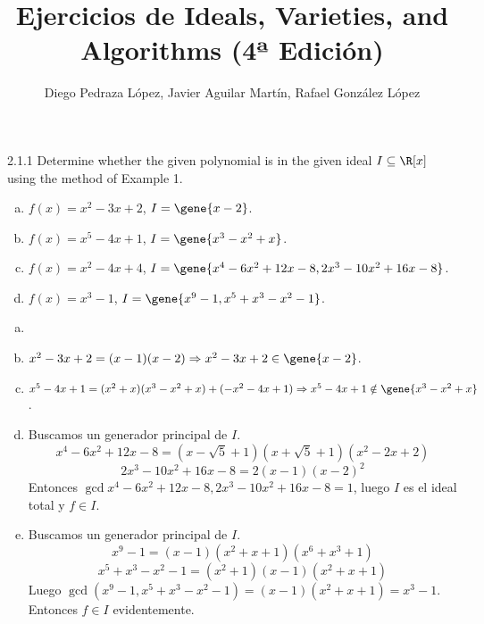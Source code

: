 \documentclass[twoside]{article}
\begin{document}
\title{Ejercicios de Ideals, Varieties, and Algorithms (4ª Edición)}
\author{Diego Pedraza López, Javier Aguilar Martín, Rafael González López}
\maketitle

\begin{ejercicio}{2.1.1}
Determine whether the given polynomial is in the given ideal $I \subseteq \R[x]$ using the method of Example 1.
\begin{enumerate}[a.]
\item $f(x) = x^2-3x+2$, $I = \gene{x-2}$.
\item $f(x) = x^5-4x+1$, $I = \gene{x^3-x^2+x}$.
\item $f(x) = x^2-4x+4$, $I = \gene{x^4-6x^2+12x-8,2x^3-10x^2+16x-8}$.
\item $f(x) = x^3-1$, $I = \gene{x^9-1,x^5+x^3-x^2-1}$.
\end{enumerate}
\end{ejercicio}
\begin{solucion}
\begin{enumerate}[a.]
\item[]
\item $x^2-3x+2 = (x-1)(x-2) \Rightarrow x^2-3x+2 \in \gene{x-2}$.
\item $x^5-4x+1 = (x^2+x)(x^3-x^2+x)+(-x^2-4x+1) \Rightarrow x^5-4x+1 \notin \gene{x^3-x^2+x}$.
\item Buscamos un generador principal de $I$.
\[ x^4-6x^2+12x-8 = (x-\sqrt{5}+1)(x+\sqrt{5}+1)(x^2-2x+2) \]
\[ 2x^3-10x^2+16x-8 = 2(x-1)(x-2)^2 \]
Entonces $\gcd{x^4-6x^2+12x-8,2x^3-10x^2+16x-8}=1$, luego $I$ es el ideal total y $f \in I$.
\item Buscamos un generador principal de $I$.
\[ x^9-1 = (x-1)(x^2+x+1)(x^6+x^3+1) \]
\[ x^5+x^3-x^2-1 = (x^2+1)(x-1)(x^2+x+1) \]
Luego $\gcd(x^9-1,x^5+x^3-x^2-1) = (x-1)(x^2+x+1) = x^3-1$.
Entonces $f \in I$ evidentemente.
\end{enumerate}
\end{solucion}

\newpage
\end{document}
